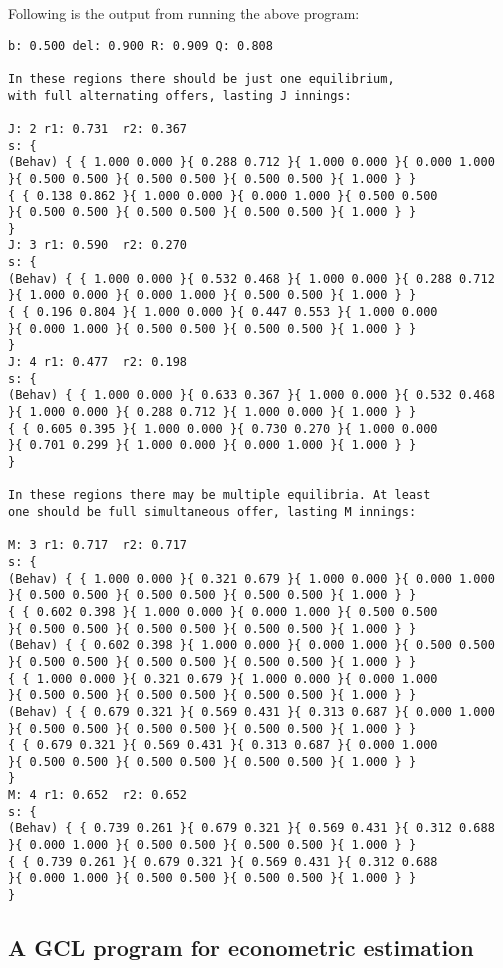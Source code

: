 \newpage
\noindent
Following is the output from running the above program:
\begin{verbatim}
b: 0.500 del: 0.900 R: 0.909 Q: 0.808

In these regions there should be just one equilibrium,
with full alternating offers, lasting J innings:
 
J: 2 r1: 0.731  r2: 0.367
s: {
(Behav) { { 1.000 0.000 }{ 0.288 0.712 }{ 1.000 0.000 }{ 0.000 1.000
}{ 0.500 0.500 }{ 0.500 0.500 }{ 0.500 0.500 }{ 1.000 } }
{ { 0.138 0.862 }{ 1.000 0.000 }{ 0.000 1.000 }{ 0.500 0.500 
}{ 0.500 0.500 }{ 0.500 0.500 }{ 0.500 0.500 }{ 1.000 } } 
}
J: 3 r1: 0.590  r2: 0.270
s: {
(Behav) { { 1.000 0.000 }{ 0.532 0.468 }{ 1.000 0.000 }{ 0.288 0.712
}{ 1.000 0.000 }{ 0.000 1.000 }{ 0.500 0.500 }{ 1.000 } }
{ { 0.196 0.804 }{ 1.000 0.000 }{ 0.447 0.553 }{ 1.000 0.000 
}{ 0.000 1.000 }{ 0.500 0.500 }{ 0.500 0.500 }{ 1.000 } } 
}
J: 4 r1: 0.477  r2: 0.198
s: {
(Behav) { { 1.000 0.000 }{ 0.633 0.367 }{ 1.000 0.000 }{ 0.532 0.468
}{ 1.000 0.000 }{ 0.288 0.712 }{ 1.000 0.000 }{ 1.000 } }
{ { 0.605 0.395 }{ 1.000 0.000 }{ 0.730 0.270 }{ 1.000 0.000 
}{ 0.701 0.299 }{ 1.000 0.000 }{ 0.000 1.000 }{ 1.000 } } 
}

In these regions there may be multiple equilibria. At least 
one should be full simultaneous offer, lasting M innings:

M: 3 r1: 0.717  r2: 0.717
s: {
(Behav) { { 1.000 0.000 }{ 0.321 0.679 }{ 1.000 0.000 }{ 0.000 1.000
}{ 0.500 0.500 }{ 0.500 0.500 }{ 0.500 0.500 }{ 1.000 } }
{ { 0.602 0.398 }{ 1.000 0.000 }{ 0.000 1.000 }{ 0.500 0.500 
}{ 0.500 0.500 }{ 0.500 0.500 }{ 0.500 0.500 }{ 1.000 } }
(Behav) { { 0.602 0.398 }{ 1.000 0.000 }{ 0.000 1.000 }{ 0.500 0.500
}{ 0.500 0.500 }{ 0.500 0.500 }{ 0.500 0.500 }{ 1.000 } }
{ { 1.000 0.000 }{ 0.321 0.679 }{ 1.000 0.000 }{ 0.000 1.000 
}{ 0.500 0.500 }{ 0.500 0.500 }{ 0.500 0.500 }{ 1.000 } }
(Behav) { { 0.679 0.321 }{ 0.569 0.431 }{ 0.313 0.687 }{ 0.000 1.000
}{ 0.500 0.500 }{ 0.500 0.500 }{ 0.500 0.500 }{ 1.000 } }
{ { 0.679 0.321 }{ 0.569 0.431 }{ 0.313 0.687 }{ 0.000 1.000 
}{ 0.500 0.500 }{ 0.500 0.500 }{ 0.500 0.500 }{ 1.000 } } 
}
M: 4 r1: 0.652  r2: 0.652
s: {
(Behav) { { 0.739 0.261 }{ 0.679 0.321 }{ 0.569 0.431 }{ 0.312 0.688
}{ 0.000 1.000 }{ 0.500 0.500 }{ 0.500 0.500 }{ 1.000 } }
{ { 0.739 0.261 }{ 0.679 0.321 }{ 0.569 0.431 }{ 0.312 0.688 
}{ 0.000 1.000 }{ 0.500 0.500 }{ 0.500 0.500 }{ 1.000 } } 
}
\end{verbatim}

\newpage
\subsection{A GCL program for econometric estimation}  

